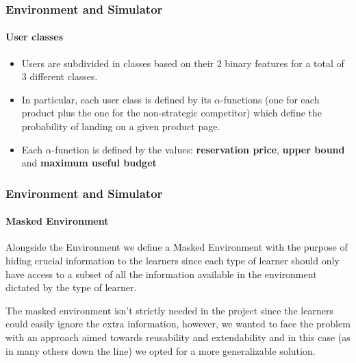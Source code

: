 \documentclass[11pt]{beamer}
\begin{document}
\begin{frame}

\frametitle{Environment and Simulator}
\framesubtitle{User classes}

\begin{itemize}[leftmargin=*, label={$\circ$}]
    \item Users are subdivided in classes based on their 2 binary features for a total of 3 different classes.
    \item In particular, each user class is defined by its $\alpha$-functions (one for each product plus the one for the non-strategic competitor) which define the probability of landing on a given product page.
    \item Each $\alpha$-function is defined by the values: \textbf{reservation price}, \textbf{upper bound} and \textbf{maximum useful budget}
\end{itemize}


\end{frame}


\begin{frame}

\frametitle{Environment and Simulator}
\framesubtitle{Masked Environment}

Alongside the Environment we define a Masked Environment with the purpose of hiding crucial information to the learners since each type of learner should only have access to a subset of all the information available in the environment dictated by the type of learner.

The masked environment isn't strictly needed in the project since the learners could easily ignore the extra information, however, we wanted to face the problem with an approach aimed towards reusability and extendability and in this case (as in many others down the line) we opted for a more generalizable solution.


\end{frame}
\end{document}
